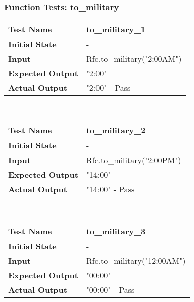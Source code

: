 \documentclass[12pt, titlepage]{article}
\begin{document}
	    \subsubsection{Function Tests: to\_military}
	    \begin{table}[!htbp]
			\begin{tabularx}{\textwidth}{|l|X|}%
				\hline
                \textbf{Test Name} & to\_military\_1  
                \\\hline
                \textbf{Initial State} & -
                \\\hline
                \textbf{Input} & Rfc.to\_military("2:00AM")
                \\\hline 
                \textbf{Expected Output} & "2:00"
                \\\hline
                \textbf{Actual Output} & "2:00" - Pass
                \\\hline
			\end{tabularx}\\ %
        \end{table}			
			\hfill	%
	    \begin{table}[!htbp]
			\begin{tabularx}{\textwidth}{|l|X|}%
				\hline
                \textbf{Test Name} & to\_military\_2  
                \\\hline
                \textbf{Initial State} & -
                \\\hline
                \textbf{Input} & Rfc.to\_military("2:00PM")
                \\\hline 
                \textbf{Expected Output} & "14:00"
                \\\hline
                \textbf{Actual Output} & "14:00" - Pass
                \\\hline
			\end{tabularx}\\ %
	    \end{table}			
			\hfill	%
	    \begin{table}[!htbp]    
			\begin{tabularx}{\textwidth}{|l|X|}%
				\hline
                \textbf{Test Name} & to\_military\_3  
                \\\hline
                \textbf{Initial State} & -
                \\\hline
                \textbf{Input} & Rfc.to\_military("12:00AM")
                \\\hline 
                \textbf{Expected Output} & "00:00"
                \\\hline
                \textbf{Actual Output} & "00:00" - Pass
                \\\hline
			\end{tabularx}\\ %
	    \end{table}			
\end{document}

